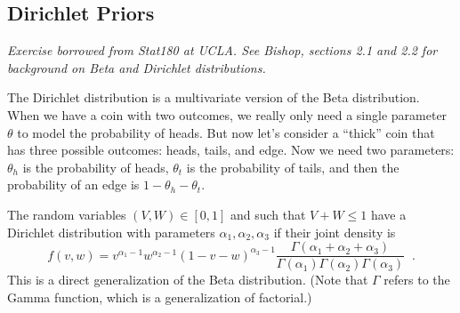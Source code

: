 \documentclass[11pt]{exam}
\begin{document}
\subsection{Dirichlet Priors}

{\it Exercise borrowed from Stat180 at UCLA.  See Bishop, sections 2.1
and 2.2 for background on Beta and Dirichlet distributions.}

The Dirichlet distribution is a multivariate version of the Beta
distribution.  When we have a coin with two outcomes, we really only
need a single parameter $\theta$ to model the probability of heads.
But now let's consider a ``thick'' coin that has three possible
outcomes:  heads, tails, and edge.  Now we need two parameters:
$\theta_h$ is the probability of heads, $\theta_t$ is the probability
of tails, and then the probability of an edge is $1 - \theta_h -
\theta_t$.  

The random variables $(V,W) \in [0,1]$ and such that $V + W \leq 1$
have a Dirichlet distribution with parameters $\alpha_1, \alpha_2,
\alpha_3$ if their joint density is
\[f(v,w) = v^{\alpha_1-1} w^{\alpha_2-1} (1 - v - w)^{\alpha_3-1}
\frac{\Gamma(\alpha_1 + \alpha_2 + \alpha_3)}{\Gamma(\alpha_1)
  \Gamma(\alpha_2) \Gamma(\alpha_3)}\;\;.\]
This is a direct generalization of the Beta distribution.  (Note that
$\Gamma$ refers to the Gamma function, which is a generalization of
factorial.) 
\end{document}
